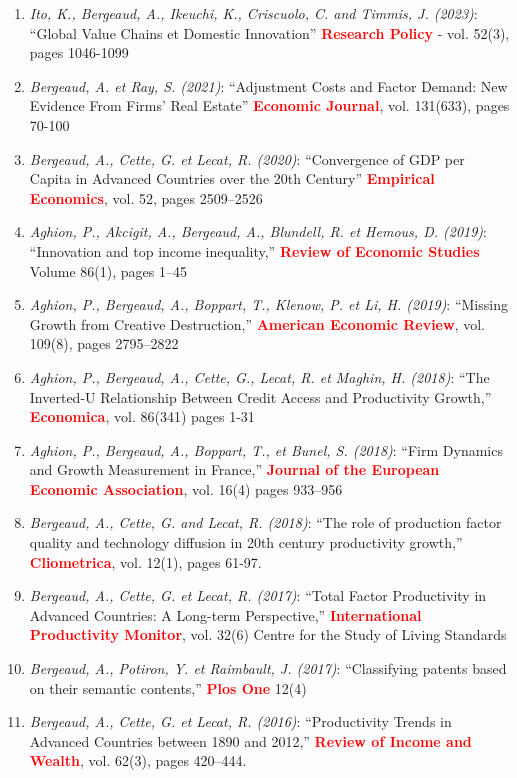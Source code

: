 \documentclass[12pt]{article}
\begin{document}
\begin{footnotesize}
\begin{enumerate}
    \item \emph{Ito, K., Bergeaud, A., Ikeuchi, K., Criscuolo, C. and Timmis, J. (2023)}: ``Global Value Chains et Domestic Innovation'' \textbf{\textcolor{red}{Research Policy}} - vol. 52(3), pages 1046-1099
    \item \emph{Bergeaud, A. et Ray, S. (2021)}: ``Adjustment Costs and Factor Demand: New Evidence From Firms' Real Estate'' \textbf{\textcolor{red}{Economic Journal}}, vol. 131(633), pages 70-100
    \item \emph{Bergeaud, A., Cette, G. et Lecat, R. (2020)}: ``Convergence of GDP per Capita in Advanced Countries over the 20th Century'' \textbf{\textcolor{red}{Empirical Economics}}, vol. 52, pages 2509–2526
    \item \emph{Aghion, P., Akcigit, A., Bergeaud, A., Blundell, R. et Hemous, D. (2019)}: ``Innovation and top income inequality,'' \textbf{\textcolor{red}{Review of Economic Studies}} Volume 86(1), pages 1–45
    \item \emph{Aghion, P., Bergeaud, A., Boppart, T., Klenow, P. et Li, H. (2019)}: ``Missing Growth from Creative Destruction,'' \textbf{\textcolor{red}{American Economic Review}}, vol. 109(8), pages 2795–2822
    \item \emph{Aghion, P., Bergeaud, A., Cette, G., Lecat, R. et Maghin, H. (2018)}: ``The Inverted-U Relationship Between Credit Access and Productivity Growth,'' \textbf{\textcolor{red}{Economica}}, vol. 86(341) pages 1-31
    \item \emph{Aghion, P., Bergeaud, A., Boppart, T., et Bunel, S. (2018)}: ``Firm Dynamics and Growth Measurement in France,'' \textbf{\textcolor{red}{Journal of the European Economic Association}}, vol. 16(4) pages 933–956
    \item \emph{Bergeaud, A., Cette, G. and Lecat, R. (2018)}: ``The role of production factor quality and technology diffusion in 20th century productivity growth,'' \textbf{\textcolor{red}{Cliometrica}}, vol. 12(1), pages 61-97. 
    \item \emph{Bergeaud, A., Cette, G. et Lecat, R. (2017)}: ``Total Factor Productivity in Advanced Countries: A Long-term Perspective,'' \textbf{\textcolor{red}{International Productivity Monitor}}, vol. 32(6) Centre for the Study of Living Standards
    \item \emph{Bergeaud, A., Potiron, Y. et Raimbault, J. (2017)}: ``Classifying patents based on their semantic contents,'' \textbf{\textcolor{red}{Plos One}} 12(4) 
    \item  \emph{Bergeaud, A., Cette, G. et Lecat, R. (2016)}: ``Productivity Trends in Advanced Countries between 1890 and 2012,'' \textbf{\textcolor{red}{Review of Income and Wealth}}, vol. 62(3), pages 420–444.  
\end{enumerate}
\end{footnotesize}
\end{document}
